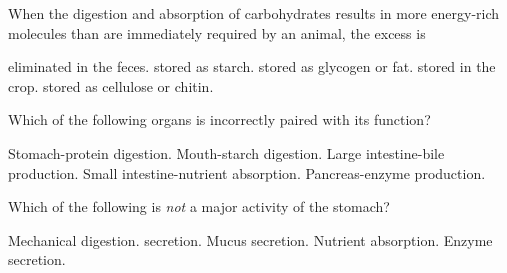 \question
When the digestion and absorption of carbohydrates results in more energy-rich molecules than are immediately required by an animal, the excess is

\begin{choices}
\choice eliminated in the feces. %
\choice stored as starch. %
\correctchoice stored as glycogen or fat. %
\choice stored in the crop. %
\choice stored as cellulose or chitin. %
\end{choices}


\question
Which of the following organs is incorrectly paired with its function?

\begin{choices}
\choice Stomach-protein digestion. %
\choice Mouth-starch digestion. %
\correctchoice Large intestine-bile production. %
\choice Small intestine-nutrient absorption. %
\choice Pancreas-enzyme production. %
\end{choices}

\question
Which of the following is \emph{not} a major activity of the stomach?

\begin{choices}
\choice Mechanical digestion. %
\choice {} secretion. %
\choice Mucus secretion. %
\correctchoice Nutrient absorption. %
\choice Enzyme secretion. %
\end{choices}


